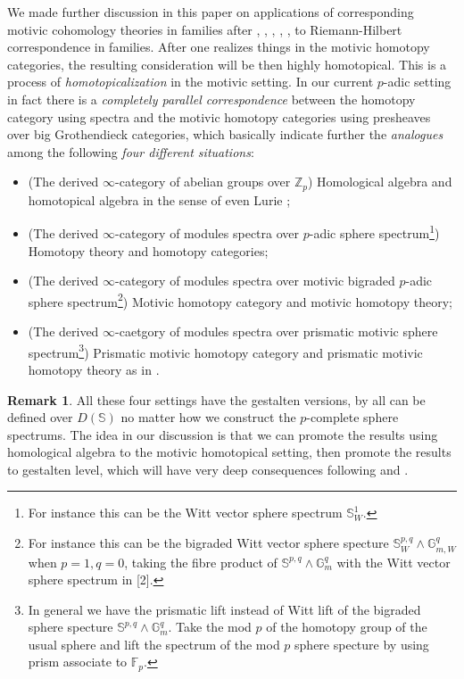 \documentclass[12pt]{article}
\theoremstyle{definition}
\newtheorem{remark}{Remark}
\begin{document}
\noindent We made further discussion in this paper on applications of corresponding motivic cohomology theories in families after \cite{5V}, \cite{5AI}, \cite{5AII}, \cite{5S2}, \cite{5G}, to Riemann-Hilbert correspondence in families. After one realizes things in the motivic homotopy categories, the resulting consideration will be then highly homotopical. This is a process of \textit{homotopicalization} in the motivic setting. In our current $p$-adic setting in fact there is a \textit{completely parallel correspondence} between the homotopy category using spectra and the motivic homotopy categories using presheaves over big Grothendieck categories, which basically indicate further the \textit{analogues} among the following \textit{four different situations}:
\begin{itemize}\setlength{\itemsep}{-0.1cm}
\item[1] (The derived $\infty$-category of abelian groups over $\mathbb{Z}_p$) Homological algebra and homotopical algebra in the sense of even Lurie \cite{5Lu1};
\item[2] (The derived $\infty$-category of modules spectra over $p$-adic sphere spectrum\footnote{For instance this can be the Witt vector sphere spectrum $\mathbb{S}^1_W$.}) Homotopy theory and homotopy categories;
\item[3] (The derived $\infty$-category of modules spectra over motivic bigraded $p$-adic  sphere spectrum\footnote{For instance this can be the bigraded Witt vector sphere specture $\mathbb{S}_W^{p,q}\wedge \mathbb{G}_{m,W}^q$ when $p=1, q=0$, taking the fibre product of $\mathbb{S}^{p,q}\wedge \mathbb{G}_m^q$ with the Witt vector sphere spectrum in [2].}) Motivic homotopy category and motivic homotopy theory;
\item[4] (The derived $\infty$-caetgory of modules spectra over prismatic motivic sphere spectrum\footnote{In general we have the prismatic lift instead of Witt lift of the bigraded sphere specture $\mathbb{S}^{p,q}\wedge \mathbb{G}_m^q$. Take the mod $p$ of the homotopy group of the usual sphere and lift the spectrum of the mod $p$ sphere specture by using prism associate to $\mathbb{F}_p$.}) Prismatic motivic homotopy category and prismatic motivic homotopy theory as in \cite{5Lu2}.
\end{itemize}

\begin{remark}
All these four settings have the gestalten versions, by all can be defined over $D(\mathbb{S})$ no matter how we construct the $p$-complete sphere spectrums. The idea in our discussion is that we can promote the results using homological algebra to the motivic homotopical setting, then promote the results to gestalten level, which will have very deep consequences following \cite{5S5} and \cite{5Ga}.
\end{remark}
\end{document}
